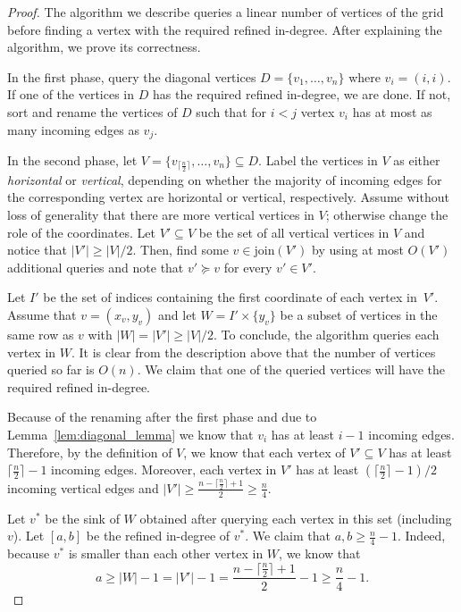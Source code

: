 \documentclass[runningheads,a4paper]{llncs}
\newcommand{\indegree}{refined in-degree\xspace}
\newcommand{\join}{\mbox{join}\xspace}
\begin{document}
\begin{proof}
The algorithm we describe queries a linear number of vertices of the grid before finding a vertex with the required \indegree. 
After explaining the algorithm, we prove its correctness.

In the first phase, query the diagonal vertices $D = \{v_1,\ldots, v_n\}$ where $v_i = (i,i)$.
If one of the vertices in $D$ has the required \indegree, we are done. 
If not, sort and rename the vertices of $D$ such that for $i < j$ vertex $v_i$ has at most as many incoming edges as $v_j$. 

In the second phase, let $V = \{v_{\lceil \frac{n}{2} \rceil},\ldots,v_n\} \subseteq D$.
Label the vertices in $V$ as either \emph{horizontal}  or \emph{vertical}, depending on whether the majority of incoming edges for the corresponding vertex are horizontal  or vertical, respectively. 
Assume without loss of generality that there are more vertical vertices in $V$; otherwise change the role of the coordinates. 
Let $V' \subseteq V$ be the set of all vertical vertices in $V$ and notice that $|V'| \geq |V|/2$.
Then, find some $v \in \join(V')$ by using at most $O(V')$ additional queries and note that $v' \succeq v$ for every $v' \in V'$.

Let $I'$ be the set of indices containing the first coordinate of each vertex in~$V'$. 
Assume that $v = (x_v, y_v)$ and let $W = I'\times \{y_v\}$ be a subset of vertices in the same row as $v$ with $|W| = |V'|\geq |V|/2$.
To conclude, the algorithm queries each vertex in $W$.
It is clear from the description above that the number of vertices queried so far is $O(n)$. 
We claim that one of the queried vertices will have the required \indegree.

Because of the renaming after the first phase and due to Lemma~\ref{lem:diagonal_lemma} we know that $v_i$ has at least $i-1$ incoming edges. 
Therefore, by the definition of $V$, we know that each vertex of $V'\subseteq V$ has at least $\lceil \frac{n}{2} \rceil - 1$ incoming edges.
Moreover, each vertex in $V'$ has at least $(\lceil \frac{n}{2}\rceil-1)/2$ incoming vertical edges and $|V'| \geq \frac{n-\lceil \frac{n}{2}\rceil + 1}{2} \geq \frac{n}{4}$. 

Let $v^*$ be the sink of $W$ obtained after querying each vertex in this set (including $v$). Let $[a,b]$ be the \indegree of $v^*$. We claim that $a, b \geq \frac{n}{4} - 1$. 
Indeed, because $v^*$ is smaller than each other vertex in $W$, we know that $$a \geq |W|-1 = |V'|-1 = \frac{n-\lceil \frac{n}{2}\rceil + 1}{2} - 1 \geq \frac{n}{4} - 1.$$



\end{proof}
\end{document}

